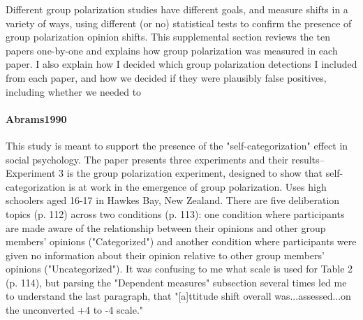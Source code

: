 \documentclass[11pt, letterpaper]{article}
\begin{document}
Different group polarization studies have different goals, and measure shifts
in a variety of ways, using different (or no) statistical tests to confirm
the presence of group polarization opinion shifts. This supplemental section
reviews the ten papers one-by-one and explains how group 
polarization was measured in each paper. I also explain how I decided which
group polarization detections I included from each paper, and how we decided
if they were plausibly false positives, including whether we needed to 

\paragraph{{Abrams1990}} This study is meant to support the presence of the "self-categorization" effect in
social psychology. The paper presents three experiments and their results--Experiment 3 is the group polarization
experiment, designed to show that self-categorization is at work in the emergence of group polarization. Uses high
schoolers aged 16-17 in Hawkes Bay, New Zealand. There are five deliberation topics (p. 112) across two conditions
(p. 113): one condition where participants are made aware of the relationship between their opinions and other group
members' opinions ("Categorized") and another condition where participants were given no information about their
opinion relative to other group members' opinions ("Uncategorized"). It was confusing to me what scale is used for
Table 2 (p. 114), but parsing the "Dependent measures" subsection several times led me to understand the last
paragraph, that "[a]ttitude shift overall was...assessed...on the unconverted +4 to -4 scale."
\end{document}
